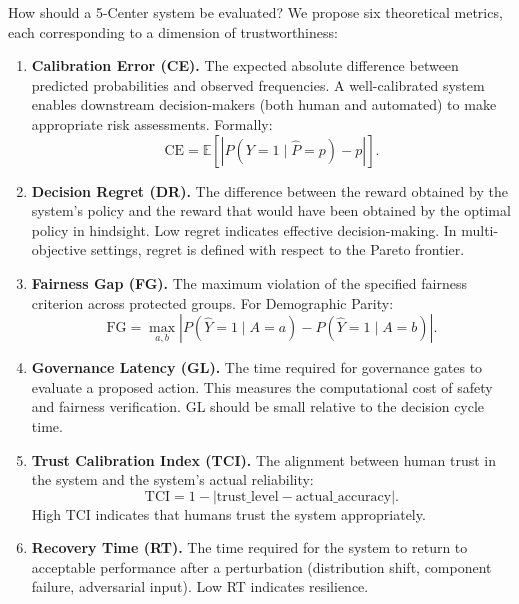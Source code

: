 \documentclass[11pt,a4paper]{article}
\begin{document}
How should a 5-Center system be evaluated? We propose six theoretical metrics, each corresponding to a dimension of trustworthiness:

\begin{enumerate}[leftmargin=*, itemsep=4pt]
  \item \textbf{Calibration Error (CE).} The expected absolute difference between predicted probabilities and observed frequencies. A well-calibrated system enables downstream decision-makers (both human and automated) to make appropriate risk assessments. Formally:
  \begin{equation}
    \mathrm{CE} = \mathbb{E}\!\left[\left|P(Y=1 \mid \hat{P}=p) - p\right|\right].
  \end{equation}

  \item \textbf{Decision Regret (DR).} The difference between the reward obtained by the system's policy and the reward that would have been obtained by the optimal policy in hindsight. Low regret indicates effective decision-making. In multi-objective settings, regret is defined with respect to the Pareto frontier.

  \item \textbf{Fairness Gap (FG).} The maximum violation of the specified fairness criterion across protected groups. For Demographic Parity:
  \begin{equation}
    \mathrm{FG} = \max_{a,b} \left|P(\hat{Y}=1 \mid A=a) - P(\hat{Y}=1 \mid A=b)\right|.
  \end{equation}

  \item \textbf{Governance Latency (GL).} The time required for governance gates to evaluate a proposed action. This measures the computational cost of safety and fairness verification. GL should be small relative to the decision cycle time.

  \item \textbf{Trust Calibration Index (TCI).} The alignment between human trust in the system and the system's actual reliability:
  \begin{equation}
    \mathrm{TCI} = 1 - \left|\text{trust\_level} - \text{actual\_accuracy}\right|.
  \end{equation}
  High TCI indicates that humans trust the system appropriately.

  \item \textbf{Recovery Time (RT).} The time required for the system to return to acceptable performance after a perturbation (distribution shift, component failure, adversarial input). Low RT indicates resilience.
\end{enumerate}
\end{document}

